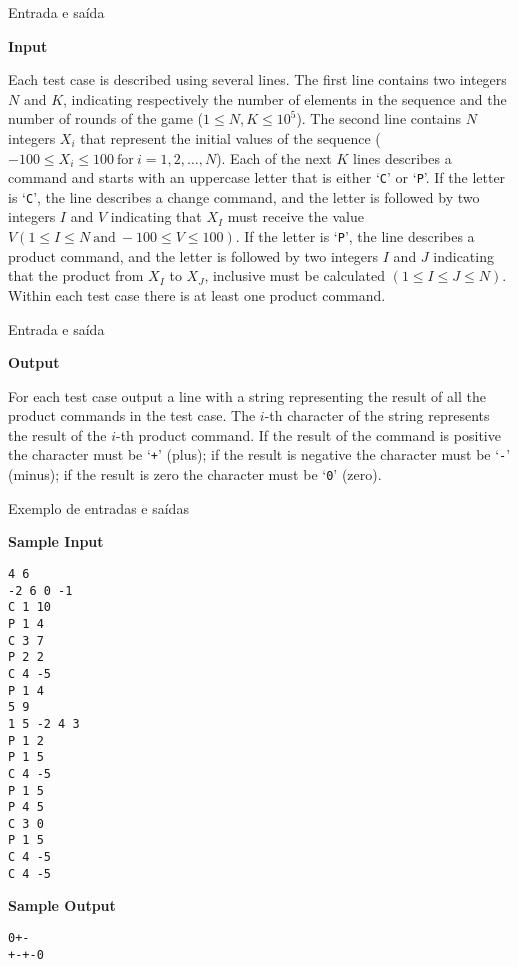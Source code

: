 \begin{frame}[fragile]{Entrada e saída}

\textbf{Input}

Each test case is described using several lines. The first line contains two integers $N$ and 
$K$, indicating respectively the number of elements in the sequence and the number of rounds of 
the game ($1\leq N, K\leq 10^5$). The second line contains $N$ integers $X_i$ that represent the 
initial values of the sequence ($-100\leq X_i\leq 100\ \mbox{for}\ i = 1, 2, \ldots, N$). Each of the next 
$K$ lines describes a command and starts with an uppercase letter that is either `\texttt{C}' or 
`\texttt{P}'. If the letter is `\texttt{C}', the line describes a change command, and
the letter is followed by two integers $I$ and $V$ indicating that $X_I$ must receive the value 
$V (1\leq I\leq N\ \mbox{and}\ -100\leq V\leq 100)$. If the letter is `\texttt{P}', the line describes a 
product command, and the letter is followed by two integers $I$ and $J$ indicating that the 
product from $X_I$ to $X_J$, inclusive must be calculated $(1\leq I\leq J\leq N)$. Within each 
test case there is at least one product command.

\end{frame}

\begin{frame}[fragile]{Entrada e saída}

\textbf{Output}

For each test case output a line with a string representing the result of all the product commands 
in the test case. The $i$-th character of the string represents the result of the $i$-th product 
command. If the result of the command is positive the character must be `\texttt{+}' (plus); if 
the result is negative the character must be `\texttt{-}' (minus); if the result is zero the 
character must be `\texttt{0}' (zero).

\end{frame}


\begin{frame}[fragile]{Exemplo de entradas e saídas}

\begin{scriptsize}
\begin{minipage}[t]{0.6\textwidth}
\textbf{Sample Input}
\begin{verbatim}
4 6
-2 6 0 -1
C 1 10
P 1 4
C 3 7
P 2 2
C 4 -5
P 1 4
5 9
1 5 -2 4 3
P 1 2
P 1 5
C 4 -5
P 1 5
P 4 5
C 3 0
P 1 5
C 4 -5
C 4 -5
\end{verbatim}
\end{minipage}
\begin{minipage}[t]{0.35\textwidth}
\textbf{Sample Output}
\begin{verbatim}
0+-
+-+-0
\end{verbatim}
\end{minipage}
\end{scriptsize}

\end{frame}

